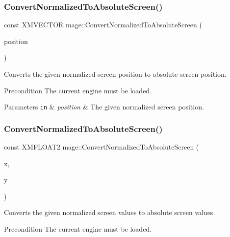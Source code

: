 \subsubsection{\texorpdfstring{Convert\+Normalized\+To\+Absolute\+Screen()}{ConvertNormalizedToAbsoluteScreen()}\hspace{0.1cm}{\footnotesize\ttfamily [1/3]}}
{\footnotesize\ttfamily const X\+M\+V\+E\+C\+T\+OR mage\+::\+Convert\+Normalized\+To\+Absolute\+Screen (\begin{DoxyParamCaption}\item[{const X\+M\+V\+E\+C\+T\+OR \&}]{position }\end{DoxyParamCaption})}

Converts the given normalized screen position to absolute screen position.

\begin{DoxyPrecond}{Precondition}
The current engine must be loaded. 
\end{DoxyPrecond}

\begin{DoxyParams}[1]{Parameters}
\mbox{\tt in}  & {\em position} & The given normalized screen position. \\
\hline
\end{DoxyParams}
\hypertarget{namespacemage_a34b18c1eb8d1e94675b10c86845e2564}{}\label{namespacemage_a34b18c1eb8d1e94675b10c86845e2564} 
\subsubsection{\texorpdfstring{Convert\+Normalized\+To\+Absolute\+Screen()}{ConvertNormalizedToAbsoluteScreen()}\hspace{0.1cm}{\footnotesize\ttfamily [2/3]}}
{\footnotesize\ttfamily const X\+M\+F\+L\+O\+A\+T2 mage\+::\+Convert\+Normalized\+To\+Absolute\+Screen (\begin{DoxyParamCaption}\item[{float}]{x,  }\item[{float}]{y }\end{DoxyParamCaption})}

Converts the given normalized screen values to absolute screen values.

\begin{DoxyPrecond}{Precondition}
The current engine must be loaded. 
\end{DoxyPrecond}

